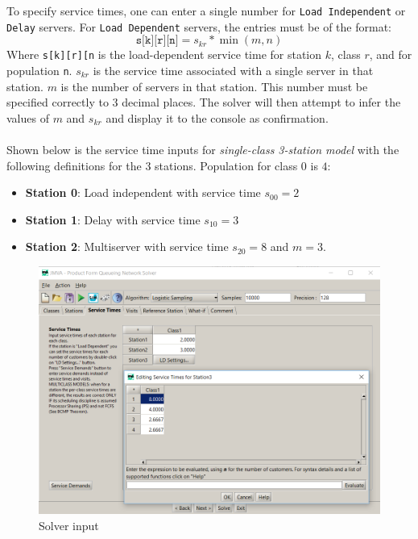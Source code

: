 To specify service times, one can enter a single number for \texttt{Load Independent} or \texttt{Delay} servers. For \texttt{Load Dependent} servers, the entries must be of the format:
\begin{equation*}
    \texttt{s[k][r][n]} = s_{kr} * \min(m,n)
\end{equation*}
Where \texttt{s[k][r][n} is the load-dependent service time for station \(k\), class \(r\), and for population \texttt{n}. \(s_{kr}\) is the service time associated with a single server in that station. \(m\) is the number of servers in that station. This number must be specified correctly to 3 decimal places. The solver will then attempt to infer the values of \(m\) and \(s_{kr}\) and display it to the console as confirmation.
\\\\
Shown below is the service time inputs for \textit{single-class 3-station model} with the following definitions for the 3 stations. Population for class 0 is \(4\):
\begin{itemize}[noitemsep]
    \item \textbf{Station 0}: Load independent with service time \(s_{00} = 2\)
    \item \textbf{Station 1}: Delay with service time \(s_{10} = 3\)
    \item \textbf{Station 2}: Multiserver with service time \(s_{20} = 8\) and \(m = 3\).
\end{itemize}

\begin{figure}[H]
\centering
\includegraphics[width=1.\textwidth]{figures/LogisticSampling_GUI_input.png}
\caption{ Solver input }
\label{fig:LogisticSampling_GUI_input}
\end{figure}

